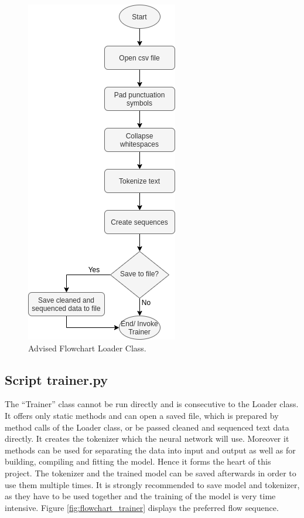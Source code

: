 \documentclass[conference]{IEEEtran}
\begin{document}
\begin{figure}[htbp]
\centerline{\includegraphics[scale=0.65]{pictures/flowchart_loader.png}}
\caption{Advised Flowchart Loader Class.}
\label{fig:flowchart_loader}
\end{figure}

\subsection{Script trainer.py}\label{subsec_trainer}

The ``Trainer'' class cannot be run directly and is consecutive to the Loader class. It offers only static methods and can open a saved file, which is prepared by method calls of the Loader class, or be passed cleaned and sequenced text data directly. It creates the tokenizer which the neural network will use. Moreover it methods can be used for separating the data into input and output as well as for building, compiling and fitting the model. Hence it forms the heart of this project. The tokenizer and the trained model can be saved afterwards in order to use them multiple times. It is strongly recommended to save model and tokenizer, as they have to be used together and the training of the model is very time intensive. Figure \ref{fig:flowchart_trainer} displays the preferred flow sequence.
\end{document}
